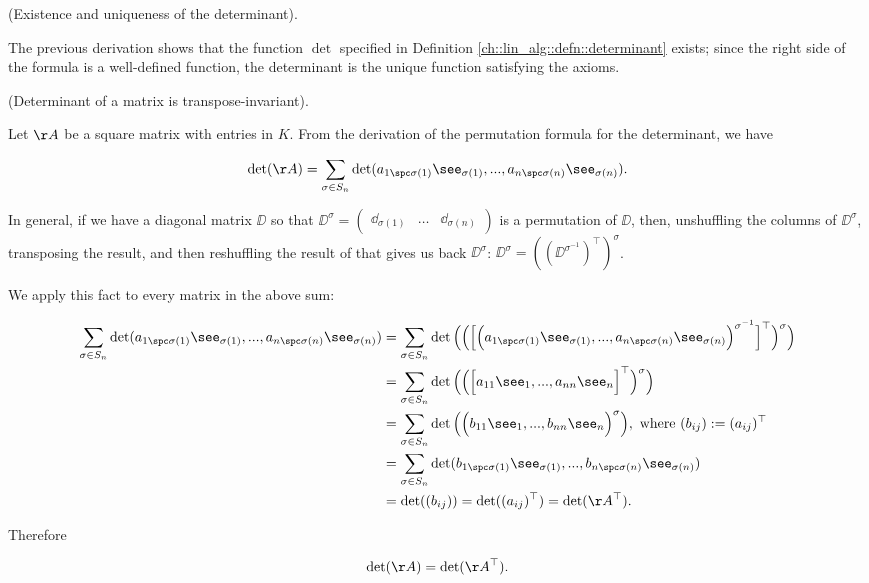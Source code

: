 \begin{remark}
\label{ch::lin_alg::rmk::det_existence_uniqueness}
    (Existence and uniqueness of the determinant).

    The previous derivation shows that the function $\det$ specified in Definition \ref{ch::lin_alg::defn::determinant} exists; since the right side of the formula is a well-defined function, the determinant is the unique function satisfying the axioms.
\end{remark}

\begin{deriv}
\label{ch::lin_alg::thm::det_transpose_invariant}    
    (Determinant of a matrix is transpose-invariant).
    
    Let $\AA$ be a square matrix with entries in $K$. From the derivation of the permutation formula for the determinant, we have
    
    \begin{align*}
        \det(\AA) = 
        \sum_{\sigma \in S_n}
        \det(a_{1 \spc \sigma(1)} \see_{\sigma(1)}, ..., a_{n \spc \sigma(n)} \see_{\sigma(n)}).
    \end{align*}

    In general, if we have a diagonal matrix $\DD$ so that $\DD^\sigma = \begin{pmatrix} \dd_{\sigma(1)} & \hdots & \dd_{\sigma(n)} \end{pmatrix}$ is a permutation of $\DD$, then, unshuffling the columns of $\DD^\sigma$, transposing the result, and then reshuffling the result of that gives us back $\DD^\sigma$: $\DD^\sigma = ((\DD^{\sigma^{-1}})^\top)^\sigma$.

    We apply this fact to every matrix in the above sum:

    \begin{align*}
        \sum_{\sigma \in S_n}
        \det(a_{1 \spc \sigma(1)} \see_{\sigma(1)}, ..., a_{n \spc \sigma(n)} \see_{\sigma(n)})
        &=
        \sum_{\sigma \in S_n}
        \det\Big( \Big(\Big[\Big(a_{1 \spc \sigma(1)} \see_{\sigma(1)}, ..., a_{n \spc \sigma(n)} \see_{\sigma(n)}\Big)^{\sigma^{-1}}\Big]^\top\Big)^\sigma \Big) \\
        &= \sum_{\sigma \in S_n} \det\Big(\Big(\Big[ a_{11} \see_1, ..., a_{nn} \see_n \Big]^\top \Big)^\sigma\Big) \\
        &= \sum_{\sigma \in S_n} \det\Big(\Big( b_{11} \see_1, ..., b_{nn} \see_n\Big)^\sigma\Big), \text{ where $(b_{ij}) := (a_{ij})^\top$} \\
        &= \sum_{\sigma \in S_n}
        \det(b_{1 \spc \sigma(1)} \see_{\sigma(1)}, ..., b_{n \spc \sigma(n)} \see_{\sigma(n)}) \\
        &= \det((b_{ij})) = \det((a_{ij})^\top) = \det(\AA^\top).
    \end{align*}
    
    Therefore
    
    \begin{align*}
        \det(\AA) = \det(\AA^\top).
    \end{align*}
\end{deriv}

